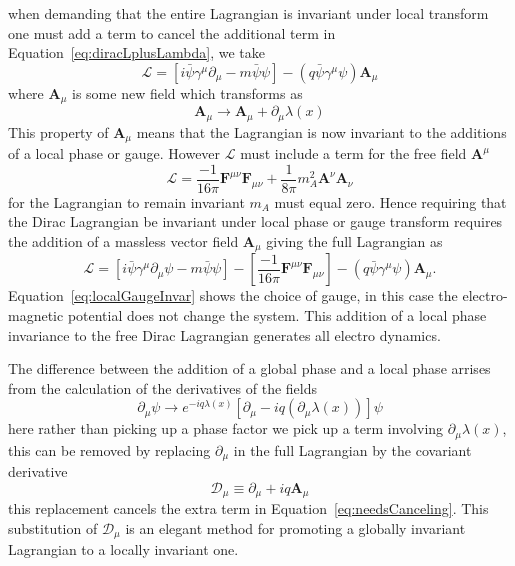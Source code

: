 when demanding that the entire Lagrangian is invariant under local transform one must add a term to cancel the additional term in Equation~\eqref{eq:diracLplusLambda}, we take
\begin{equation}
  \mathcal{L} = \left[i\bar{\psi}\gamma^{\mu}\partial_{\mu} - m \bar{\psi}\psi\right] - \left(q\bar{\psi}\gamma^{\mu}\psi\right)\bm{A}_{\mu}
\end{equation}
where $\bm{A}_{\mu}$ is some new field which transforms as
\begin{equation}
  \bm{A}_{\mu}\rightarrow \bm{A}_{\mu} + \partial_{\mu}\lambda(x)
  \label{eq:localGaugeInvar}
\end{equation}
This property of $\bm{A}_{\mu}$ means that the Lagrangian is now invariant to 
the additions of a local phase or gauge. However $\mathcal{L}$ must include a 
term for the free field $\bm{A}^{\mu}$
\begin{equation}
  \mathcal{L} = \frac{-1}{16\pi}\bm{F}^{\mu\nu}\bm{F}_{\mu\nu} + \frac{1}{8\pi}m_{A}^{2}\bm{A}^{\nu}\bm{A}_{\nu}
\end{equation}
for the Lagrangian to remain invariant $m_{A}$ must equal zero. Hence requiring 
that the Dirac Lagrangian be invariant under local phase or gauge transform 
requires the addition of a massless vector field $\bm{A}_{\mu}$ giving the full 
Lagrangian as
\begin{equation}
  \mathcal{L} = \left[i\bar{\psi}\gamma^{\mu}\partial_{\mu}\psi - m \bar{\psi}\psi\right] - \left[\frac{-1}{16\pi}\bm{F}^{\mu\nu}\bm{F}_{\mu\nu}\right] - \left(q\bar{\psi}\gamma^{\mu}\psi\right)\bm{A}_{\mu}.
\end{equation}
Equation~\eqref{eq:localGaugeInvar} shows the choice of gauge, in this case the 
electro-magnetic potential does not change the system. This addition of a local 
phase invariance to the free Dirac Lagrangian generates all electro dynamics.

The difference between the addition of a global phase and a local phase arrises 
from the calculation of the derivatives of the fields
\begin{equation}
  \partial_{\mu}\psi\rightarrow e^{-iq\lambda(x)}\left[\partial_{\mu}- iq\left(\partial_{\mu}\lambda(x)\right)\right]\psi
  \label{eq:needsCanceling}
\end{equation}
here rather than picking up a phase factor we pick up a term involving 
$\partial_{\mu}\lambda(x)$, this can be removed by replacing $\partial_{\mu}$ 
in the full Lagrangian by the covariant derivative
\begin{equation}
  \mathcal{D}_{\mu} \equiv \partial_{\mu} + iq\bm{A}_{\mu}
\end{equation}
this replacement cancels the extra term in Equation~\eqref{eq:needsCanceling}. 
This substitution of $\mathcal{D}_{\mu}$ is an elegant method for promoting a 
globally invariant Lagrangian to a locally invariant one.

